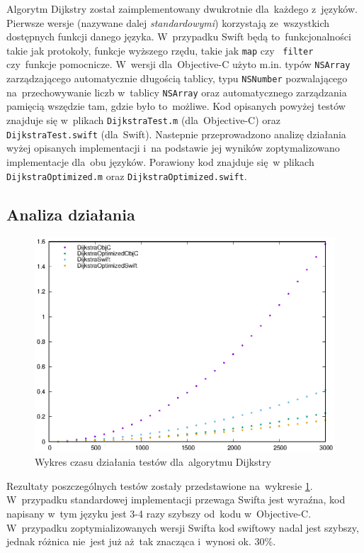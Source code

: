 \documentclass[mgr, shortabstract]{iithesis}
\newcommand{\swiftinline}[1]{
    \texttt{#1}
}
\newcommand{\objcinline}[1]{
    \texttt{#1}
}
\begin{document}
Algorytm Dijkstry został zaimplementowany dwukrotnie dla~każdego z~języków. Pierwsze wersje (nazywane dalej \textit{standardowymi}) korzystają ze~wszystkich dostępnych funkcji danego języka. W~przypadku Swift będą to~funkcjonalności takie jak protokoły, funkcje wyższego rzędu, takie jak \swiftinline{map} czy~\swiftinline{filter} czy~funkcje pomocnicze. W~wersji dla~Objective-C użyto m.in. typów \objcinline{NSArray} zarządzającego automatycznie długością tablicy, typu \objcinline{NSNumber} pozwalającego na~przechowywanie liczb w~tablicy \objcinline{NSArray} oraz automatycznego zarządzania pamięcią wszędzie tam, gdzie było to~możliwe. Kod opisanych powyżej testów znajduje się w~plikach \texttt{DijkstraTest.m} (dla~Objective-C) oraz \texttt{DijkstraTest.swift} (dla~Swift). Nastepnie przeprowadzono analizę działania wyżej opisanych implementacji i~na podstawie jej wyników zoptymalizowano implementacje dla~obu języków. Porawiony kod znajduje się w plikach \texttt{DijkstraOptimized.m} oraz \texttt{DijkstraOptimized.swift}.

\subsection{Analiza działania}

\begin{figure}
    \includegraphics{plots/Dijkstra}
    \caption{Wykres czasu działania testów dla~algorytmu Dijkstry}
    \label{p:dijkstra}
\end{figure}

Rezultaty poszczególnych testów zostały przedstawione na~wykresie \ref{p:dijkstra}. W~przypadku standardowej implementacji przewaga Swifta jest wyraźna, kod napisany w~tym języku jest 3-4 razy szybszy od~kodu w~Objective-C. W~przypadku zoptymializowanych wersji Swifta kod swiftowy nadal jest szybszy, jednak różnica nie~jest już aż~tak znacząca i~wynosi ok. 30\%.
\end{document}
